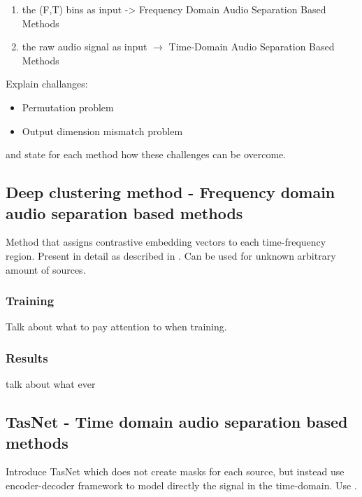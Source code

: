 \begin{enumerate}
  \item the (F,T) bins as input -> Frequency Domain Audio Separation Based Methods
  \item the raw audio signal as input $\to$ Time-Domain Audio Separation Based Methods
\end{enumerate}

Explain challanges:

\begin{itemize}
  \item Permutation problem 
  \item Output dimension mismatch problem
\end{itemize}

and state for each method how these challenges can be overcome.

\subsection{Deep clustering method - Frequency domain audio separation based methods} %
\label{sub:frequency_domain_audio_separation}

Method that assigns contrastive embedding vectors to each time-frequency region.
Present in detail as described in \cite{BasicDeepClustering:2016}.
Can be used for unknown arbitrary amount of sources. 

\subsubsection{Training} %

Talk about what to pay attention to when training.

\subsubsection{Results} 

talk about what ever

\subsection{TasNet - Time domain audio separation based methods} %
\label{sub:time_domain_audio_separation}

Introduce TasNet which does not create masks for each source, but instead use encoder-decoder 
framework to model directly the signal in the time-domain. Use \cite{TasNet}.

